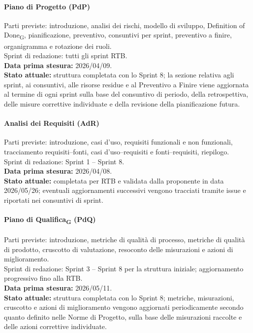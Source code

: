 \paragraph{Piano di Progetto (PdP)}
Parti previste: introduzione, analisi dei rischi, modello di sviluppo,
Definition of Done\textsubscript{G}, pianificazione, preventivo, consuntivi per
sprint, preventivo a finire, organigramma e rotazione dei ruoli.\\
Sprint di redazione: tutti gli sprint RTB.\\
\textbf{Data prima stesura:} 2026/04/09.\\
\textbf{Stato attuale:} struttura completata con lo Sprint 8; la sezione relativa
agli sprint, ai consuntivi, alle risorse residue e al Preventivo a Finire viene
aggiornata al termine di ogni sprint sulla base del consuntivo di periodo,
della retrospettiva, delle misure correttive individuate e della revisione della
pianificazione futura.

\paragraph{Analisi dei Requisiti (AdR)}
Parti previste: introduzione, casi d'uso, requisiti funzionali e non funzionali,
tracciamento requisiti--fonti, casi d'uso--requisiti e fonti--requisiti,
riepilogo.\\
Sprint di redazione: Sprint 1 -- Sprint 8.\\
\textbf{Data prima stesura:} 2026/04/08.\\
\textbf{Stato attuale:} completata per RTB e validata dalla proponente in data
2026/05/26; eventuali aggiornamenti successivi vengono tracciati tramite issue
e riportati nei consuntivi di sprint.

\paragraph{Piano di Qualifica\textsubscript{G} (PdQ)}
Parti previste: introduzione, metriche di qualità di processo, metriche di
qualità di prodotto, cruscotto di valutazione, resoconto delle misurazioni e
azioni di miglioramento.\\
Sprint di redazione: Sprint 3 -- Sprint 8 per la struttura iniziale; aggiornamento progressivo fino alla RTB.\\
\textbf{Data prima stesura:} 2026/05/11.\\
\textbf{Stato attuale:} struttura completata con lo Sprint 8; metriche,
misurazioni, cruscotto e azioni di miglioramento vengono aggiornati
periodicamente secondo quanto definito nelle Norme di Progetto, sulla base
delle misurazioni raccolte e delle azioni correttive individuate.

